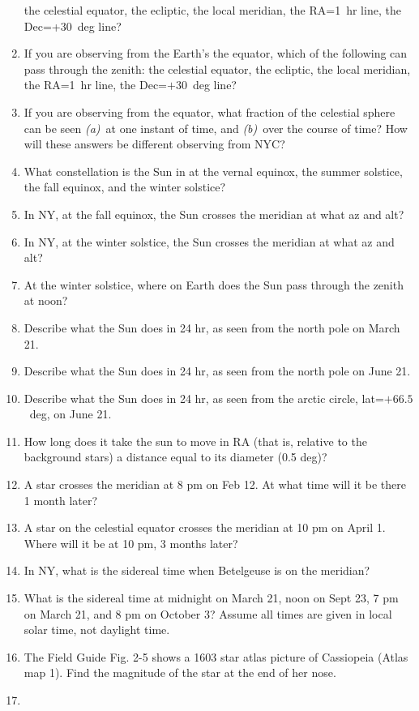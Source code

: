 \documentclass{article}
\begin{document}
\begin{enumerate}
the celestial equator, the ecliptic, the local meridian, the RA=1~hr
line, the Dec=+30~deg line?
\item
If you are observing from the Earth's the equator, which of the
following can pass through the zenith: the celestial equator, the
ecliptic, the local meridian, the RA=1~hr line, the Dec=$+30$~deg
line?
\item
If you are observing from the equator, what fraction of the celestial
sphere can be seen \textsl{(a)}~at one instant of time, and
\textsl{(b)}~over the course of time?  How will these answers be
different observing from NYC?
\item
What constellation is the Sun in at the vernal equinox, the summer
solstice, the fall equinox, and the winter solstice?
\item
In NY, at the fall equinox, the Sun crosses the meridian at what
az and alt?
\item
In NY, at the winter solstice, the Sun crosses the meridian at what
az and alt?
\item
At the winter solstice, where on Earth does the Sun pass through
the zenith at noon?
\item
Describe what the Sun does in 24 hr, as seen from the north pole on
March 21.
\item
Describe what the Sun does in 24 hr, as seen from the north pole on
June 21.
\item
Describe what the Sun does in 24 hr, as seen from the arctic circle,
lat=$+66.5$~deg, on June 21.
\item
How long does it take the sun to move in RA (that is, relative to the
background stars) a distance equal to its diameter (0.5 deg)?
\item
A star crosses the meridian at 8 pm on Feb 12. At what time will it be
there 1 month later?
\item
A star on the celestial equator crosses the meridian at 10 pm on April
1. Where will it be at 10 pm, 3 months later?
\item
In NY, what is the sidereal time when Betelgeuse is on the meridian?
\item
What is the sidereal time at midnight on March 21, noon on Sept 23, 7
pm on March 21, and 8 pm on October 3?  Assume all times are given in
local solar time, not daylight time.
\item
The Field Guide Fig. 2-5 shows a 1603 star atlas picture of Cassiopeia
(Atlas map 1). Find the magnitude of the star at the end of her nose.
\item

\end{enumerate}
\end{document}
